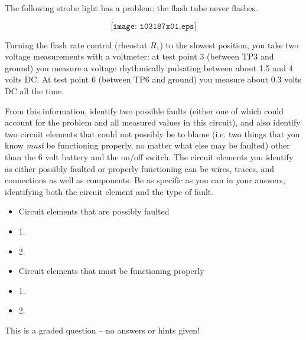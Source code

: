 

The following strobe light has a problem: the flash tube never flashes.

$$\texttt{[image: i03187x01.eps]}$$

Turning the flash rate control (rheostat $R_1$) to the slowest position, you take two voltage measurements with a voltmeter: at test point 3 (between TP3 and ground) you measure a voltage rhythmically pulsating between about 1.5 and 4 volts DC.  At test point 6 (between TP6 and ground) you measure about 0.3 volts DC all the time.

From this information, identify two possible faults (either one of which could account for the problem and all measured values in this circuit), and also identify two circuit elements that could not possibly be to blame (i.e. two things that you know {\it must} be functioning properly, no matter what else may be faulted) other than the 6 volt battery and the on/off switch.  The circuit elements you identify as either possibly faulted or properly functioning can be wires, traces, and connections as well as components.  Be as specific as you can in your answers, identifying both the circuit element and the type of fault.

\begin{itemize}
\goodbreak
\item{} Circuit elements that are possibly faulted
\item{1.}
\item{2.} 
\end{itemize}

\begin{itemize}
\goodbreak
\item{} Circuit elements that must be functioning properly
\item{1.} 
\item{2.} 
\end{itemize}

\vfil 

\eject






This is a graded question -- no answers or hints given!






